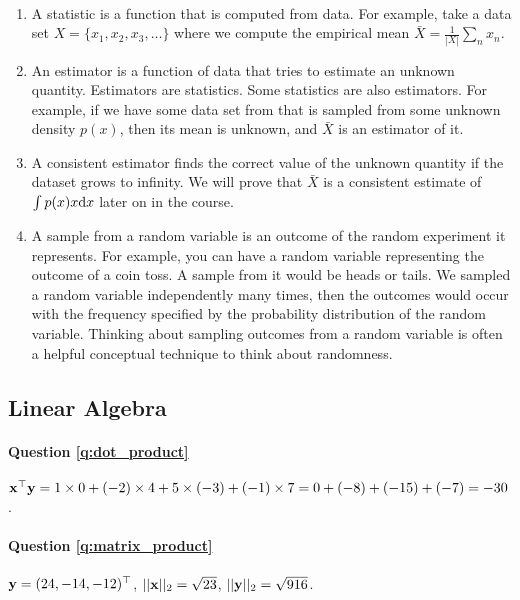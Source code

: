 \paragraph{}
\begin{enumerate}[label=\alph*.]
\item A statistic is a function that is computed from data. For example, take a data set $X = \{x_1, x_2, x_3, \dots\}$ where we compute the empirical mean $\bar X = \frac{1}{|X|}\sum_n x_n$.
\item An estimator is a function of data that tries to estimate an unknown quantity. Estimators are statistics. Some statistics are also estimators. For example, if we have some data set from that is sampled from some unknown density $p(x)$, then its mean is unknown, and $\bar X$ is an estimator of it.
\item A consistent estimator finds the correct value of the unknown quantity if the dataset grows to infinity. We will prove that $\bar X$ is a consistent estimate of $\int p(x) x \mathrm{d} x$ later on in the course.
\item A sample from a random variable is an outcome of the random experiment it represents. For example, you can have a random variable representing the outcome of a coin toss. A sample from it would be heads or tails. We sampled a random variable independently many times, then the outcomes would occur with the frequency specified by the probability distribution of the random variable. Thinking about sampling outcomes from a random variable is often a helpful conceptual technique to think about randomness.
\end{enumerate}

\subsection{Linear Algebra}

\paragraph{Question \ref{q:dot_product}}
$\mathbf{x}^\top \mathbf{y} = 1 \times 0 + (-2) \times 4 + 5 \times (-3) + (-1) \times 7 = 0 + (-8) + (-15) + (-7) = -30$.

\paragraph{Question \ref{q:matrix_product}}
$\mathbf{y} = (24, -14, -12)^\top$, $|| \mathbf{x} ||_2 = \sqrt{23}$, $|| \mathbf{y} ||_2 = \sqrt{916}$.

